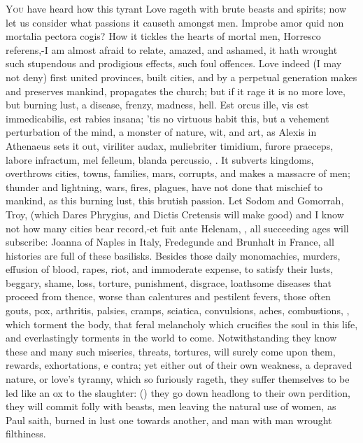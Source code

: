 \lettrine{Y}{ou} have heard how this tyrant Love rageth with brute beasts and
spirits; now let us consider what passions it causeth amongst men.
Improbe amor quid non mortalia pectora cogis? How it tickles the
hearts of mortal men, Horresco referens,-I am almost afraid to relate,
amazed, and ashamed, it hath wrought such stupendous and
prodigious effects, such foul offences. Love indeed (I may not deny)
first united provinces, built cities, and by a perpetual generation
makes and preserves mankind, propagates the church; but if it rage it
is no more love, but burning lust, a disease, frenzy, madness, hell.
Est orcus ille, vis est immedicabilis, est rabies insana; 'tis no
virtuous habit this, but a vehement perturbation of the mind, a monster
of nature, wit, and art, as Alexis in Athenaeus sets it out,
viriliter audax, muliebriter timidium, furore praeceps, labore
infractum, mel felleum, blanda percussio, \etc{}. It subverts kingdoms,
overthrows cities, towns, families, mars, corrupts, and makes a
massacre of men; thunder and lightning, wars, fires, plagues, have not
done that mischief to mankind, as this burning lust, this brutish
passion. Let Sodom and Gomorrah, Troy, (which Dares Phrygius, and
Dictis Cretensis will make good) and I know not how many cities bear
record,-et fuit ante Helenam, \etc{}, all succeeding ages will subscribe:
Joanna of Naples in Italy, Fredegunde and Brunhalt in France, all
histories are full of these basilisks. Besides those daily monomachies,
murders, effusion of blood, rapes, riot, and immoderate expense, to
satisfy their lusts, beggary, shame, loss, torture, punishment,
disgrace, loathsome diseases that proceed from thence, worse than
calentures and pestilent fevers, those often gouts, pox, arthritis,
palsies, cramps, sciatica, convulsions, aches, combustions, \etc{}, which
torment the body, that feral melancholy which crucifies the soul in
this life, and everlastingly torments in the world to come.
Notwithstanding they know these and many such miseries, threats,
tortures, will surely come upon them, rewards, exhortations, e contra;
yet either out of their own weakness, a depraved nature, or love's
tyranny, which so furiously rageth, they suffer themselves to be led
like an ox to the slaughter: () they go down
headlong to their own perdition, they will commit folly with beasts,
men leaving the natural use of women, as Paul saith, burned in
lust one towards another, and man with man wrought filthiness.

